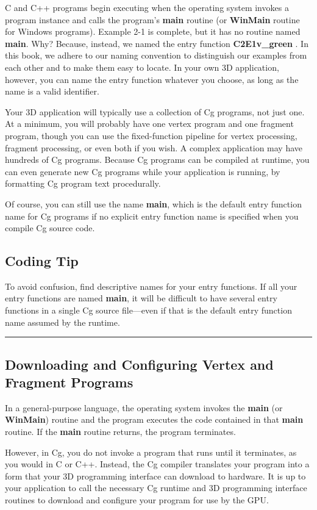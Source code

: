 \documentclass{book}
\begin{document}
C and C++ programs begin executing when the operating system invokes a program instance and calls the program's \textbf{main} routine (or \textbf{WinMain} routine for Windows programs). Example 2-1 is complete, but it has no routine named \textbf{main}. Why? Because, instead, we named the entry function \textbf{C2E1v\_green} . In this book, we adhere to our naming convention to distinguish our examples from each other and to make them easy to locate. In your own 3D application, however, you can name the entry function whatever you choose, as long as the name is a valid identifier.

Your 3D application will typically use a collection of Cg programs, not just one. At a minimum, you will probably have one vertex program and one fragment program, though you can use the fixed-function pipeline for vertex processing, fragment processing, or even both if you wish. A complex application may have hundreds of Cg programs. Because Cg programs can be compiled at runtime, you can even generate new Cg programs while your application is running, by formatting Cg program text procedurally.

Of course, you can still use the name \textbf{main}, which is the default entry function name for Cg programs if no explicit entry function name is specified when you compile Cg source code.

\subsection*{Coding Tip}

To avoid confusion, find descriptive names for your entry functions. If all your entry functions are named \textbf{main}, it will be difficult to have several entry functions in a single Cg source file—even if that is the default entry function name assumed by the runtime.
\hrule

\subsection{Downloading and Configuring Vertex and Fragment Programs}

In a general-purpose language, the operating system invokes the \textbf{main} (or \textbf{WinMain}) routine and the program executes the code contained in that \textbf{main} routine. If the \textbf{main} routine returns, the program terminates.

However, in Cg, you do not invoke a program that runs until it terminates, as you would in C or C++. Instead, the Cg compiler translates your program into a form that your 3D programming interface can download to hardware. It is up to your application to call the necessary Cg runtime and 3D programming interface routines to download and configure your program for use by the GPU.
\end{document}
